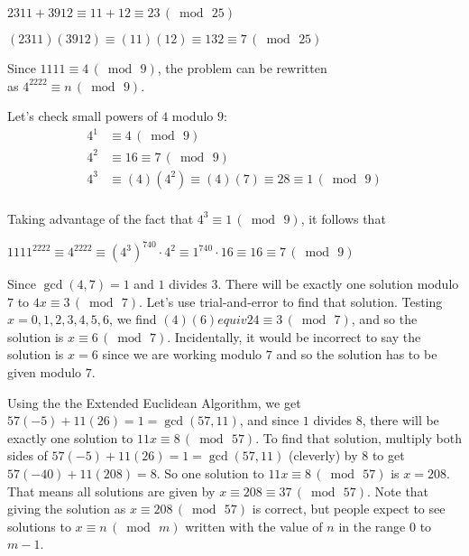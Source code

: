 \begin{Solution}{26.4}
$2311+3912 \equiv 11 + 12 \equiv 23 \, (\bmod\, 25)$

\end{Solution}

\begin{Solution}{26.5}
$(2311)(3912) \equiv (11)(12) \equiv 132 \equiv 7\, (\bmod\, 25)$

\end{Solution}

\begin{Solution}{26.6}
Since $1111\equiv 4\,(\bmod\,9)$, the problem can be rewritten\\
 as $4^{2222}\equiv n \, (\bmod\,9)$.

Let's check small powers of $4$ modulo $9$:\\
\begin{align*}
4^{1} &\equiv 4\, (\bmod\,9)\\
4^{2} &\equiv 16 \equiv 7 \, (\bmod\,9)\\
4^{3} &\equiv (4)(4^{2}) \equiv (4)(7) \equiv 28 \equiv 1\, (\bmod\,9)\\
\end{align*}

Taking advantage of the fact that $4^{3}\equiv 1\, (\bmod\,9)$, it follows that

$1111^{2222} \equiv 4^{2222} \equiv (4^{3})^{740} \cdot 4^{2} \equiv 1^{740}\cdot16 \equiv 16 \equiv 7 \, (\bmod\,9)$

\end{Solution}

\begin{Solution}{26.7}
Since $\gcd(4,7) = 1$ and $1$ divides $3$. There will be exactly one solution modulo $7$ to $4x\equiv 3\,(\bmod\,7)$. Let's use trial{-}and{-}error to find that solution. Testing $x = 0,1, 2, 3, 4, 5, 6$, we find $(4)(6)equiv 24 \equiv 3\,(\bmod\,7)$, and so the solution is $x\equiv 6 \,(\bmod\,7)$. Incidentally, it would be incorrect to say the solution is $x=6$ since we are working modulo $7$ and so the solution has to be given modulo $7$.

\end{Solution}

\begin{Solution}{26.8}
Using the the Extended Euclidean Algorithm, we get $57(-5) + 11(26) = 1 = \gcd(57,11)$, and since $1$ divides $8$, there will be exactly one solution to $11x\equiv 8 \, (\bmod\,57)$. To find that solution, multiply both sides of $57(-5) + 11(26) = 1 = \gcd(57,11)$ (cleverly) by $8$ to get $57(-40) + 11(208) = 8$. So one solution to
$11x\equiv 8\,(\bmod\,57)$ is $x = 208$. That means all solutions are given by
$x \equiv 208 \equiv 37\,(\bmod\,57)$. Note that giving the solution as $x \equiv 208\,(\bmod\,57)$ is correct,
but people expect to see solutions to $x\equiv n\,(\bmod\, m)$ written with the value of $n$ in the range $0$ to $m-1$. 

\end{Solution}

